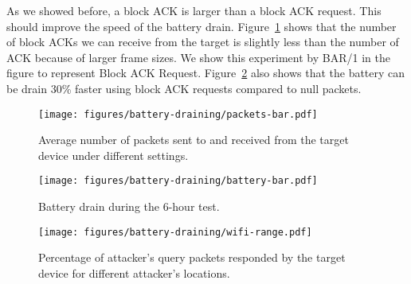 As we showed before, a block ACK is larger than a block ACK request. This should improve the speed of the battery drain. 
Figure~\ref{fig:inject-bar} shows that the number of block ACKs we can receive from the target is slightly less than the number of ACK because of larger frame sizes. We show this experiment by BAR/1 in the figure to represent Block ACK Request.
Figure~\ref{fig:battery-bar} also shows that the battery can be drain 30\% faster using block ACK requests compared to null packets.

\begin{figure}
    \centering
    \texttt{[image: figures/battery-draining/packets-bar.pdf]}
    \vspace{-10pt}
    \caption{Average number of packets sent to and received from the target device under different settings.}
    \vspace{-15pt}
    \label{fig:inject-bar}
\end{figure}

\begin{figure}
    \centering
    \texttt{[image: figures/battery-draining/battery-bar.pdf]}
    \vspace{-10pt}
    \caption{Battery drain during the 6-hour test.}
    \vspace{-15pt}
    \label{fig:battery-bar}
\end{figure}

\begin{figure*}[t]
    \centering
    \texttt{[image: figures/battery-draining/wifi-range.pdf]}
    \vspace{-15pt}
    \caption{Percentage of attacker's query packets responded by the target device for different attacker's locations.}
    \label{fig:wifi-range}
\end{figure*}


